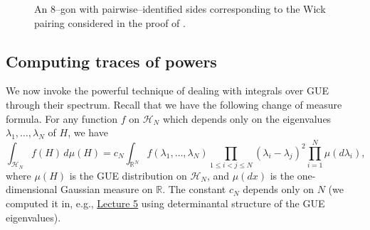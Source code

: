 \documentclass[letterpaper,11pt,oneside,reqno]{article}
\numberwithin{equation}{section}
\theoremstyle{definition}
\begin{document}
\begin{figure}[htbp]
  \centering
  \caption{An $8$–gon with pairwise–identified sides corresponding to the
           Wick pairing considered in the proof of .}
  \label{fig:octagon-gluing}
\end{figure}

\subsection{Computing traces of powers}
\label{subsec:traces-powers-computation}

We now invoke the powerful technique of dealing with
integrals over GUE through their spectrum.
Recall that we have the following change of measure formula.
For any function $f$ on $\mathcal{H}_N$ which depends only on the eigenvalues
$\lambda_1,\ldots,\lambda_N$ of $H$, we have
\begin{equation*}
	\int_{\mathcal{H}_N} f(H) \, d\mu(H) =
	c_N
	\int_{\mathbb{R}^N}
	f(\lambda_1,\ldots,\lambda_N) \prod_{1\le i<j\le N}
	(\lambda_i-\lambda_j)^2
	\prod_{i=1}^{N}\mu(d\lambda_i),
\end{equation*}
where $\mu(H)$ is the GUE distribution on $\mathcal{H}_N$, and
$\mu(dx)$ is the one-dimensional Gaussian measure on $\mathbb{R}$.
The constant $c_N$ depends only on $N$ (we computed it in,
e.g.,
\href{https://lpetrov.cc/rmt25/rmt25-notes/rmt2025-l05.pdf}{Lecture
5} using determinantal structure of the
GUE eigenvalues).
\end{document}
